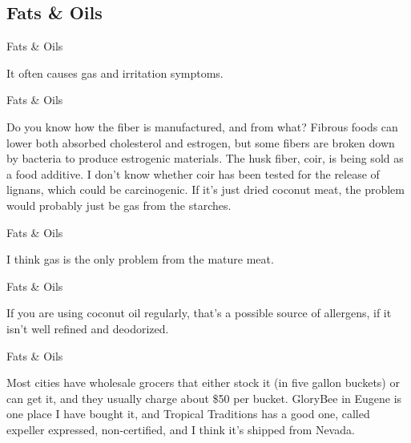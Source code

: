 \documentclass[11pt,oneside,openany,extrafontsizes]{memoir}
\begin{document}
\subsection{Fats \& Oils}

\begin{standalonequote}{Fats \& Oils}

    \begin{answer}
        It often causes gas and irritation symptoms.
    \end{answer}
\end{standalonequote}

\begin{standalonequote}{Fats \& Oils}

    \begin{answer}
        Do you know how the fiber is manufactured, and from what? Fibrous foods can lower both absorbed cholesterol and estrogen, but some fibers are broken down by bacteria to produce estrogenic materials. The husk fiber, coir, is being sold as a food additive. I don't know whether coir has been tested for the release of lignans, which could be carcinogenic. If it's just dried coconut meat, the problem would probably just be gas from the starches.
    \end{answer}
\end{standalonequote}

\begin{standalonequote}{Fats \& Oils}

    \begin{answer}
        I think gas is the only problem from the mature meat.
    \end{answer}
\end{standalonequote}

\begin{standalonequote}{Fats \& Oils}

    \begin{answer}
        If you are using coconut oil regularly, that's a possible source of allergens, if it isn't well refined and deodorized.
    \end{answer}
\end{standalonequote}

\begin{standalonequote}{Fats \& Oils}

    \begin{answer}
        Most cities have wholesale grocers that either stock it (in five gallon buckets) or can get it, and they usually charge about \$50 per bucket. GloryBee in Eugene is one place I have bought it, and Tropical Traditions has a good one, called expeller expressed, non-certified, and I think it's shipped from Nevada.
    \end{answer}
\end{standalonequote}
\end{document}
